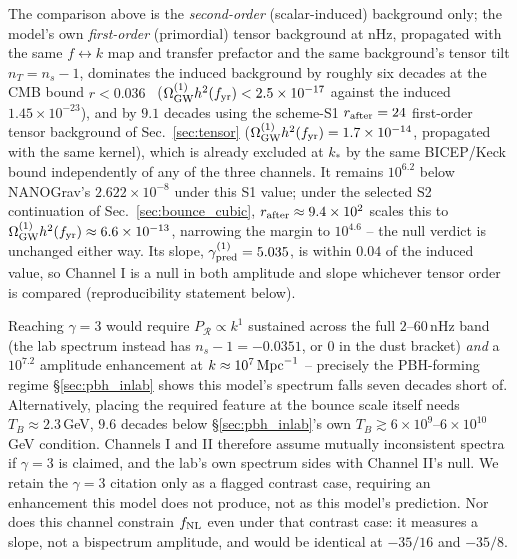 \documentclass[aps,prd,twocolumn,superscriptaddress,nofootinbib,longbibliography]{revtex4-2}
\newcommand{\fnl}{f_{\rm NL}}
\newcommand{\OmGW}{\Omega_{\rm GW}}
\begin{document}
The comparison above is the \emph{second-order} (scalar-induced) background
only; the model's own \emph{first-order} (primordial) tensor background at
nHz, propagated with the same $f\leftrightarrow k$ map and transfer
prefactor and the same background's tensor tilt $n_T=n_s-1$, dominates the
induced background by roughly six decades at the CMB bound
$r<0.036$~\cite{BicepKeck2021} ($\OmGW^{(1)}h^2(f_{\rm yr})<2.5\times10^{-17}$
against the induced $1.45\times10^{-23}$), and by $9.1$ decades using the
scheme-S1 $r_{\rm after}=24$ first-order tensor background of
Sec.~\ref{sec:tensor} ($\OmGW^{(1)}h^2(f_{\rm yr})=1.7\times10^{-14}$,
propagated with the same kernel), which is already excluded at $k_*$ by
the same BICEP/Keck bound independently of any of the three channels. It
remains $10^{6.2}$ below NANOGrav's
$2.622\times10^{-8}$ under this S1 value; under the selected S2
continuation of Sec.~\ref{sec:bounce_cubic}, $r_{\rm after}\approx9.4\times10^2$
scales this to $\OmGW^{(1)}h^2(f_{\rm yr})\approx6.6\times10^{-13}$, narrowing
the margin to $10^{4.6}$ -- the null verdict is unchanged either way. Its
slope, $\gamma_{\rm pred}^{(1)}=5.035$, is
within $0.04$ of the induced value, so Channel I is a null in both amplitude
and slope whichever tensor order is compared
(reproducibility statement below).

Reaching $\gamma=3$ would require $P_\mathcal R\propto k^1$ sustained
across the full $2$--$60\,$nHz band (the lab spectrum instead has
$n_s-1=-0.0351$, or $0$ in the dust bracket) \emph{and} a
$10^{7.2}$ amplitude enhancement at $k\approx10^7\,{\rm Mpc}^{-1}$ --
precisely the PBH-forming regime \S\ref{sec:pbh_inlab} shows this model's
spectrum falls seven decades short of. Alternatively, placing the required
feature at the bounce scale itself needs $T_B\approx2.3\,$GeV, $9.6$
decades below \S\ref{sec:pbh_inlab}'s own $T_B\gtrsim6\times10^{9}$--$6\times10^{10}\,$GeV
condition. Channels I and II therefore assume mutually
inconsistent spectra if $\gamma=3$ is claimed, and the lab's own spectrum
sides with Channel II's null. We retain the $\gamma=3$ citation only as a
flagged contrast case, requiring an enhancement this model does not
produce, not as this model's prediction. Nor does this channel constrain
$\fnl$ even under that contrast case: it measures a slope, not a
bispectrum amplitude, and would be identical at $-35/16$ and $-35/8$.
\end{document}
